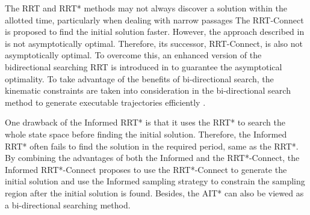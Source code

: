 The RRT and RRT* methods may not always discover a solution within the allotted time, particularly when dealing with narrow passages
The RRT-Connect \cite{kuffner2000rrt} is proposed to find the initial solution faster. 
However, the approach described in \cite{kuffner2000rrt} is not asymptotically optimal. Therefore, its successor, RRT-Connect, is also not asymptotically optimal. 
To overcome this, an enhanced version of the bidirectional searching RRT is introduced in \cite{klemm2015rrt} to guarantee the asymptotical optimality.
To take advantage of the benefits of bi-directional search, the kinematic constraints are taken into consideration in the bi-directional search method to generate executable trajectories efficiently \cite{wang2021kinematic}.


One drawback of the Informed RRT* \cite{gammell2014informed} \cite{gammell2018informed} is that it uses the RRT* to search the whole state space before finding the initial solution.
Therefore, the Informed RRT* often fails to find the solution in the required period, same as the RRT*.
By combining the advantages of both the Informed and the RRT*-Connect, the Informed RRT*-Connect \cite{2020Informed} proposes to use the RRT*-Connect to generate the initial solution and use the Informed sampling strategy to constrain the sampling region after the initial solution is found.
Besides, the AIT* \cite{strub2020adaptively} can also be viewed as a bi-directional searching method.



